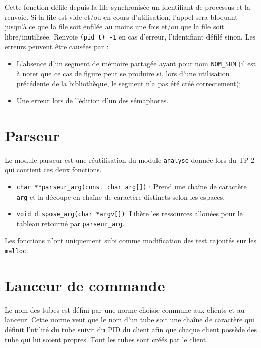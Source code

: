 \documentclass[12pt]{article}
\begin{document}
Cette fonction défile depuis la file synchronisée un identifiant de
processus et la renvoie. Si la file est vide et/ou en cours d'utilisation,
l'appel sera bloquant jusqu'à ce que la file soit enfilée au moins une fois
et/ou que la file soit libre/inutilisée.
Renvoie \texttt{(pid\_t) -1} en cas d'erreur, l'identifiant défilé sinon.
Les erreurs peuvent être causées par :
\begin{itemize}
    \item L'absence d'un segment de mémoire partagée ayant pour nom
          \texttt{NOM\_SHM} (il est à noter que ce cas de figure peut se produire si,
          lors d'une utilisation précédente de la bibliothèque, le segment n'a pas été
          créé correctement);
    \item Une erreur lors de l'édition d'un des sémaphores.
\end{itemize}

\section{Parseur}
Le module parseur est une réutilisation du module \texttt{analyse} donnée
lors
du TP 2 qui contient ces deux fonctions.

\begin{itemize}
    \item \texttt{char **parseur\_arg(const char arg[])} : Prend une chaîne
          de caractère \texttt{arg} et la découpe en chaîne de caractère distincts selon
          les espaces.

    \item \texttt{void dispose\_arg(char *argv[])}: Libère les ressources
          allouées pour le tableau retourné par \texttt{parseur\_arg}.
\end{itemize}
Les fonctions n'ont uniquement subi comme modification des test rajoutés
sur les \texttt{malloc}.

\section{Lanceur de commande}
Le nom des tubes est défini par une norme choisie commune aux clients et au
lanceur. Cette norme veut que le nom d'un tube soit une chaîne de caractère qui
définit l'utilité du tube suivit du PID du client afin que chaque client
possède des tube qui lui soient propres. Tout les tubes sont créés par le
client.
\end{document}
